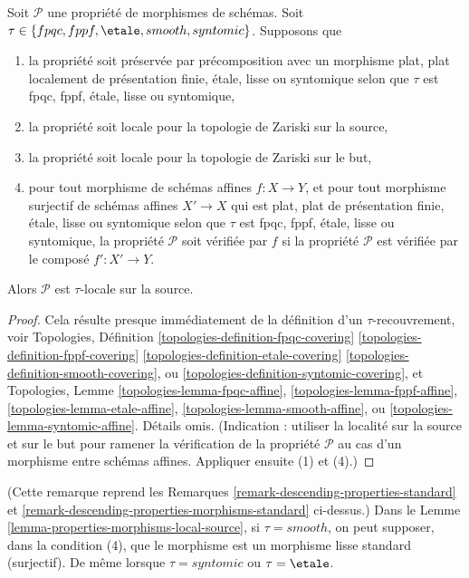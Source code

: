 \begin{lemma}
\label{lemma-properties-morphisms-local-source}
Soit $\mathcal{P}$ une propriété de morphismes de schémas.
Soit $\tau \in \{fpqc, \linebreak[0] fppf, \linebreak[0]
\etale, \linebreak[0] smooth, \linebreak[0] syntomic\}$.
Supposons que
\begin{enumerate}
\item la propriété soit préservée par précomposition avec un morphisme
plat, plat localement de présentation finie, \'etale, lisse ou syntomique
selon que $\tau$ est fpqc, fppf, \'etale, lisse ou syntomique,
\item la propriété soit locale pour la topologie de Zariski sur la source,
\item la propriété soit locale pour la topologie de Zariski sur le but,
\item pour tout morphisme de schémas affines $f : X \to Y$, et pour tout
morphisme surjectif de schémas affines $X' \to X$ qui est plat, plat de
présentation finie, \'etale, lisse ou syntomique selon que $\tau$ est
fpqc, fppf, \'etale, lisse ou syntomique, la propriété $\mathcal{P}$ soit
vérifiée par $f$ si la propriété $\mathcal{P}$ est vérifiée par le composé
$f' : X' \to Y$.
\end{enumerate}
Alors $\mathcal{P}$ est $\tau$-locale sur la source.
\end{lemma}

\begin{proof}
Cela résulte presque immédiatement de la définition d'un
$\tau$-recouvrement, voir
Topologies, Définition
\ref{topologies-definition-fpqc-covering}
\ref{topologies-definition-fppf-covering}
\ref{topologies-definition-etale-covering}
\ref{topologies-definition-smooth-covering}, ou
\ref{topologies-definition-syntomic-covering},
et Topologies, Lemme
\ref{topologies-lemma-fpqc-affine},
\ref{topologies-lemma-fppf-affine},
\ref{topologies-lemma-etale-affine},
\ref{topologies-lemma-smooth-affine}, ou
\ref{topologies-lemma-syntomic-affine}.
Détails omis. (Indication : utiliser la localité sur la source et sur le but
pour ramener la vérification de la propriété $\mathcal{P}$ au cas d'un
morphisme entre schémas affines. Appliquer ensuite (1) et (4).)
\end{proof}

\begin{remark}
\label{remark-properties-morphisms-local-source-standard}
(Cette remarque reprend les Remarques
\ref{remark-descending-properties-standard}
et \ref{remark-descending-properties-morphisms-standard} ci-dessus.)
Dans le Lemme \ref{lemma-properties-morphisms-local-source}, si
$\tau = smooth$, on peut supposer, dans la condition (4), que le morphisme est
un morphisme lisse standard (surjectif).
De même lorsque $\tau = syntomic$ ou $\tau = \etale$.
\end{remark}



